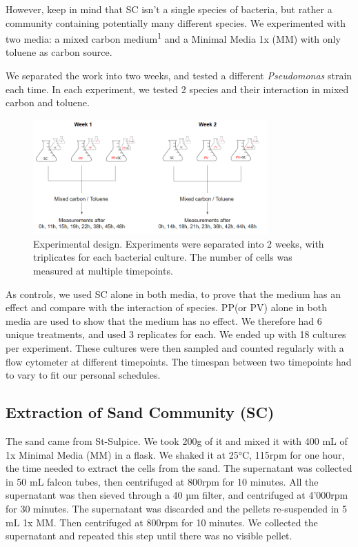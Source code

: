 \documentclass[a4paper, 10pt, conference]{ieeeconf}   %
\begin{document}
However, keep in mind that SC isn't a single species of bacteria, but rather a community containing potentially many different species.
We experimented with two media: a mixed carbon medium\textsuperscript{1} and a Minimal Media 1x (MM) with only toluene as carbon source.


We separated the work into two weeks, and tested a different \textit{Pseudomonas} strain each time. In each experiment, we tested 2 species and their interaction in mixed carbon and toluene.

\begin{figure}[H]

	  
		\includegraphics[width=9cm]{erlenmeyer.PNG}
		\caption{Experimental design. Experiments were separated into 2 weeks, with triplicates for each bacterial culture. The number of cells was measured at multiple timepoints.}
		\label{design_weeks}
	
\end{figure}

As controls, we used SC alone in both media, to prove that the medium has an effect and compare with the interaction of species. PP(or PV) alone in both media are used to show that the medium has no effect.
We therefore had 6 unique treatments, and used 3 replicates for each. We ended up with 18 cultures per experiment. These cultures were then sampled and counted regularly with a flow cytometer at different timepoints. The timespan between two timepoints had to vary to fit our personal schedules.


\subsection{Extraction of Sand Community (SC)}
The sand came from St-Sulpice. We took 200g of it and mixed it with 400 mL of 1x Minimal Media (MM) in a flask. We shaked it at 25°C, 115rpm for one hour, the time needed to extract the cells from the sand. The supernatant was collected in 50 mL falcon tubes, then centrifuged at 800rpm for 10 minutes. All the supernatant was then sieved through a 40 µm filter, and centrifuged at 4’000rpm for 30 minutes. The supernatant was discarded and the pellets re-suspended in 5 mL 1x MM. Then centrifuged at 800rpm for 10 minutes. We collected the supernatant and repeated this step until there was no visible pellet.
\end{document}
